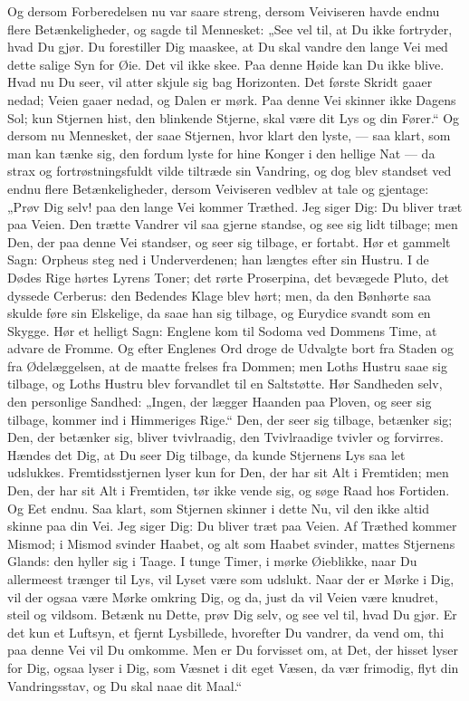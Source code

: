\documentclass[12pt,a4paper]{book}
\newcommand{\apage}[1]{\marginnote{\footnotesize\textit{[#1]}}}
\begin{document}
Og dersom Forberedelsen nu var saare streng, dersom Veiviseren havde endnu flere Betænkeligheder, og sagde til Mennesket: „See vel til, at Du ikke fortryder, hvad Du gjør. Du forestiller Dig maaskee, at Du skal vandre den lange Vei med dette salige Syn for Øie. Det vil ikke skee. Paa denne Høide kan Du ikke blive. Hvad nu Du seer, vil atter skjule sig bag Horizonten. Det første Skridt gaaer nedad; Veien gaaer nedad, og Dalen er mørk. Paa denne Vei skinner ikke Dagens Sol; kun Stjernen hist, den blinkende Stjerne, skal være dit Lys og din Fører.“ Og dersom nu Mennesket, der saae Stjernen, hvor klart den lyste, --- saa klart, som man kan tænke sig, den fordum lyste for hine Konger i den hellige Nat --- da strax og fortrøstningsfuldt vilde tiltræde sin Vandring, og dog blev standset ved endnu flere Betænkeligheder, dersom Veiviseren vedblev at tale og gjentage: „Prøv Dig selv! paa den lange Vei kommer Træthed. Jeg siger Dig: Du bliver træt paa Veien. Den trætte Vandrer vil saa gjerne standse, og see sig lidt tilbage; men Den, der paa denne Vei standser, og seer sig tilbage, er fortabt. Hør et gammelt Sagn: Orpheus steg ned i Underverdenen; han længtes efter sin Hustru. I de Dødes Rige hørtes Lyrens Toner; det rørte Proserpina, det bevægede Pluto, det dyssede Cerberus: den Bedendes Klage blev hørt; men, da den Bønhørte saa skulde føre sin Elskelige, da saae han sig tilbage, og Eurydice svandt som en Skygge. Hør et helligt Sagn: Englene kom til Sodoma ved Dommens Time, at advare de Fromme. Og efter Englenes Ord droge de Udvalgte bort fra Staden og fra Ødelæggelsen, at de maatte frelses fra Dommen; men Loths Hustru saae sig tilbage, og Loths Hustru blev forvandlet til en Saltstøtte. Hør Sandheden selv, den personlige Sandhed: „Ingen, der lægger Haanden paa Ploven, og seer sig tilbage, kommer ind i Himmeriges Rige.“ Den, der seer sig tilbage, betænker sig; Den, der \apage{8}
betænker sig, bliver tvivlraadig, den Tvivlraadige tvivler og forvirres. Hændes det Dig, at Du seer Dig tilbage, da kunde Stjernens Lys saa let udslukkes. Fremtidsstjernen lyser kun for Den, der har sit Alt i Fremtiden; men Den, der har sit Alt i Fremtiden, tør ikke vende sig, og søge Raad hos Fortiden. Og Eet endnu. Saa klart, som Stjernen skinner i dette Nu, vil den ikke altid skinne paa din Vei. Jeg siger Dig: Du bliver træt paa Veien. Af Træthed kommer Mismod; i Mismod svinder Haabet, og alt som Haabet svinder, mattes Stjernens Glands: den hyller sig i Taage. I tunge Timer, i mørke Øieblikke, naar Du allermeest trænger til Lys, vil Lyset være som udslukt. Naar der er Mørke i Dig, vil der ogsaa være Mørke omkring Dig, og da, just da vil Veien være knudret, steil og vildsom. Betænk nu Dette, prøv Dig selv, og see vel til, hvad Du gjør. Er det kun et Luftsyn, et fjernt Lysbillede, hvorefter Du vandrer, da vend om, thi paa denne Vei vil Du omkomme. Men er Du forvisset om, at Det, der hisset lyser for Dig, ogsaa lyser i Dig, som Væsnet i dit eget Væsen, da vær frimodig, flyt din Vandringsstav, og Du skal naae dit Maal.“
\end{document}
